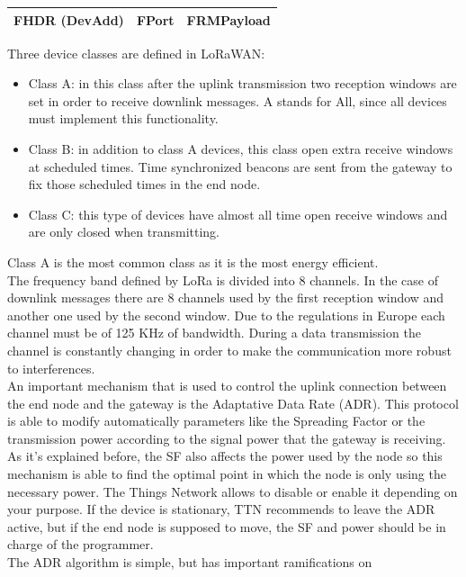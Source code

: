 \begin{center}
\begin{tabular}{ |c|c|c| } 
    \hline
    FHDR (DevAdd) & FPort & FRMPayload \\ 
    \hline
\end{tabular}
\end{center}

Three device classes are defined in LoRaWAN:
\begin{itemize}
    \item Class A: in this class after the uplink transmission two reception
windows are set in order to receive downlink messages. A stands
for All, since all devices must implement this functionality.
    \item Class B: in addition to class A devices, this class open extra
receive windows at scheduled times. Time synchronized beacons
are sent from the gateway to fix those scheduled times in the end
node.
    \item Class C: this type of devices have almost all time open receive
windows and are only closed when transmitting.
\end{itemize}
Class A is the most common class as it is the most energy efficient.\\
The frequency band defined by LoRa is divided into 8 channels. In the
case of downlink messages there are 8 channels used by the first
reception window and another one used by the second window. Due to
the regulations in Europe each channel must be of 125 KHz of
bandwidth. During a data transmission the channel is constantly
changing in order to make the communication more robust to
interferences.\\
An important mechanism that is used to control the uplink connection
between the end node and the gateway is the Adaptative Data Rate
(ADR). This protocol is able to modify automatically parameters like the
Spreading Factor or the transmission power according to the signal
power that the gateway is receiving. As it's explained before, the SF also
affects the power used by the node so this mechanism is able to find the
optimal point in which the node is only using the necessary power. The
Things Network allows to disable or enable it depending on your
purpose. If the device is stationary, TTN recommends to leave the ADR
active, but if the end node is supposed to move, the SF and power
should be in charge of the programmer.\\
The ADR algorithm is simple, but has important ramifications on 
